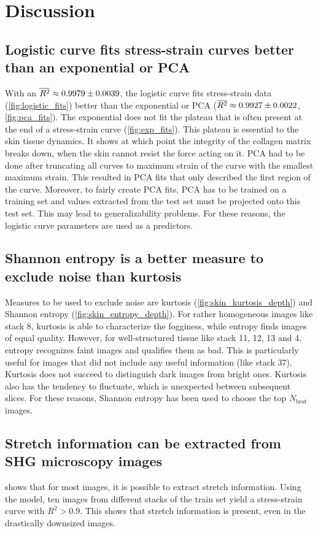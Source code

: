 \section{Discussion}

\subsection{Logistic curve fits stress-strain curves better than an exponential or PCA}
With an $\overline{R^2} \approx \num{0.9979 \pm 0.0039}$, the logistic curve fits stress-strain data (\cref{fig:logistic_fits}) better than the exponential or PCA ($\overline{R^2} \approx \num{0.9927 \pm 0.0022}$, \cref{fig:pca_fits}).
The exponential does not fit the plateau that is often present at the end of a stress-strain curve (\cref{fig:exp_fits}).
This plateau is essential to the skin tissue dynamics.
It shows at which point the integrity of the collagen matrix breaks down, \ie when the skin cannot resist the force acting on it.
PCA had to be done after truncating all curves to maximum strain of the curve with the smallest maximum strain.
This resulted in PCA fits that only described the first region of the curve.
Moreover, to fairly create PCA fits, PCA has to be trained on a training set and values extracted from the test set must be projected onto this test set.
This may lead to generalizability problems.
For these reasons, the logistic curve parameters are used as a predictors.

\subsection{Shannon entropy is a better measure to exclude noise than kurtosis}\label{sec:disc_ent_vs_kur}
Measures to be used to exclude noise are kurtosis (\cref{fig:skin_kurtosis_depth}) and Shannon entropy (\cref{fig:skin_entropy_depth}).
For rather homogeneous images like stack 8, kurtosis is able to characterize the fogginess, while entropy finds images of equal quality.
However, for well-structured tissue like stack 11, 12, 13 and 4, entropy recognizes faint images and qualifies them as bad.
This is particularly useful for images that did not include any useful information (like stack 37).
Kurtosis does not succeed to distinguish dark images from bright ones.
Kurtosis also has the tendency to fluctuate, which is unexpected between subsequent slices.
For these reasons, Shannon entropy has been used to choose the top $N_\mathrm{best}$ images.

\subsection{Stretch information can be extracted from SHG microscopy images}
 shows that for most images, it is possible to extract stretch information.
Using the model, ten images from different stacks of the train set yield a stress-strain curve with $R^2>0.9$.
This shows that stretch information is present, even in the drastically downsized images.

